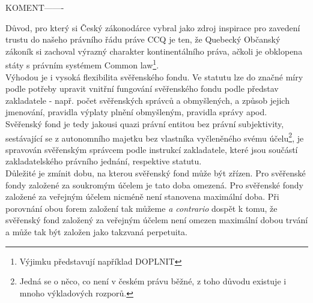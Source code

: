 \documentclass{article}
\begin{document}


KOMENT-------

Důvod, pro který si Český zákonodárce vybral jako zdroj inspirace pro zavedení trustu do našeho právního řádu práve CCQ je ten, že Quebecký Občanský zákoník si zachoval výrazný charakter kontinentálního práva, ačkoli je obklopena státy s právním systémem Common law\footnote{Výjimku představují například DOPLNIT}.\\

Výhodou je i vysoká flexibilita svěřenského fondu. Ve statutu lze do značné míry podle potřeby upravit vnitřní fungování svěřenského fondu podle představ zakladatele - např. počet svěřenských správců a obmyšlených, a způsob jejich jmenování, pravidla výplaty plnění obmyšleným, pravidla správy apod.\\


Svěřenský fond je tedy jakousi quazi právní entitou bez právní subjektivity, sestávající se z autonomního majetku bez vlastníka vyčleněného svému účelu\footnote{Jedná se o něco, co není v českém právu běžné, z toho důvodu existuje i mnoho výkladových rozporů.}, je spravován svěřenským správcem podle instrukcí zakladatele, které jsou součástí zakladatelského právního jednání, respektive statutu.\\

Důležité je zmínit dobu, na kterou svěřenský fond může být zřízen. Pro svěřenské fondy založené za soukromým účelem je tato doba omezená. Pro svěřenské fondy založené za veřejným účelem nicméně není stanovena maximální doba. Při porovnání obou forem založení tak můžeme \textit{a contrario} dospět k tomu, že svěřenský fond založený za veřejným účelem není omezen maximální dobou trvání a může tak být založen jako takzvaná perpetuita.\\
\end{document}
